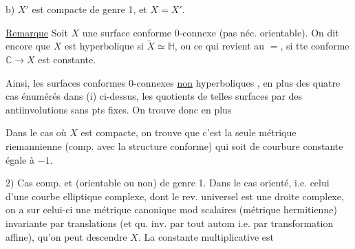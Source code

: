b) $X'$ est compacte de genre 1, et $X=X'$.

\uline{Remarque} Soit  $X$ une surface conforme $0$-connexe (pas néc. orientable). On dit encore que $X$ est hyperbolique si $\widetilde X\simeq\mathbb H$, ou ce qui revient au $=$, si tte  conforme $\mathbb C\longrightarrow X$ est constante.


Ainsi, les surfaces conformes  $0$-connexes \uline{non} hyperboliques , en plus des quatre cas énumérés dans (i) ci-dessus, les quotients de telles surfaces par des antiinvolutions sans pts fixes. On trouve donc en plus


Dans le cas où $X$ est compacte, on trouve que c'est la seule métrique riemannienne (comp. avec la structure conforme) qui soit de courbure constante égale à $-1$.

2) Cas  comp. et (orientable ou non) de genre 1. Dans le cas orienté, i.e. celui d'une courbe elliptique complexe, dont le rev. universel est une droite complexe, on a sur celui-ci une métrique canonique mod scalaires (métrique hermitienne) invariante par translations (et qu. inv. par tout autom i.e. par transformation affine), qu'on peut descendre  $X$. La constante multiplicative est








